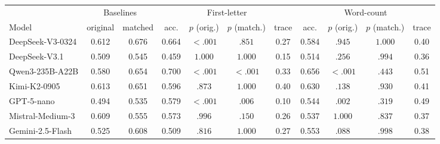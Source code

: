 {\footnotesize\setlength{\tabcolsep}{2.6pt}
\begin{tabular}{lcccccccccc}
\toprule
 & \multicolumn{2}{c}{Baselines} & \multicolumn{4}{c}{First-letter} & \multicolumn{4}{c}{Word-count} \\
\cmidrule(lr){2-3} \cmidrule(lr){4-7} \cmidrule(lr){8-11}
Model & original & matched & acc. & $p$ (orig.) & $p$ (match.) & trace & acc. & $p$ (orig.) & $p$ (match.) & trace \\
\midrule
DeepSeek-V3-0324 & 0.612 & 0.676 & 0.664 & {\boldmath$<.001$} & $.851$ & 0.27 & 0.584 & $.945$ & $1.000$ & 0.40 \\
DeepSeek-V3.1 & 0.509 & 0.545 & 0.459 & $1.000$ & $1.000$ & 0.15 & 0.514 & $.256$ & $.994$ & 0.36 \\
Qwen3-235B-A22B & 0.580 & 0.654 & 0.700 & {\boldmath$<.001$} & {\boldmath$<.001$} & 0.33 & 0.656 & {\boldmath$<.001$} & $.443$ & 0.51 \\
Kimi-K2-0905 & 0.613 & 0.651 & 0.596 & $.873$ & $1.000$ & 0.40 & 0.630 & $.138$ & $.930$ & 0.41 \\
GPT-5-nano & 0.494 & 0.535 & 0.579 & {\boldmath$<.001$} & {\boldmath$.006$} & 0.10 & 0.544 & {\boldmath$.002$} & $.319$ & 0.49 \\
Mistral-Medium-3 & 0.609 & 0.555 & 0.573 & $.996$ & $.150$ & 0.26 & 0.537 & $1.000$ & $.837$ & 0.37 \\
Gemini-2.5-Flash & 0.525 & 0.608 & 0.509 & $.816$ & $1.000$ & 0.27 & 0.553 & $.088$ & $.998$ & 0.38 \\
\bottomrule
\end{tabular}}
